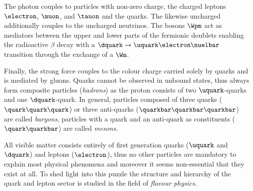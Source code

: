 The photon couples to particles with non-zero \EM charge, \ie the charged
leptons $\electron$, $\muon$, and $\tauon$ and the quarks. The likewise
uncharged \Zboson additionally couples to the uncharged neutrinos. The bosons
$\Wpm$ act as mediators between the upper and lower parts of the fermionic
doublets enabling \eg the radioactive $\beta$ decay with a
$\dquark\to\uquark\electron\nuelbar$ transition through the exchange of a $\Wm$.

Finally, the strong force couples to the colour charge carried solely by quarks
and is mediated by gluons. Quarks cannot be observed in unbound states, thus
always form composite particles (\emph{hadrons}) as \eg the proton consists of
two $\uquark$-quarks and one $\dquark$-quark. In general, particles composed of
three quarks ($\quark\quark\quark$) or three anti-quarks
($\quarkbar\quarkbar\quarkbar$) are called \emph{baryons}, particles with a
quark and an anti-quark as constituents ($\quark\quarkbar$) are called
\emph{mesons}.

All visible matter consists entirely of first generation quarks ($\uquark$ and
$\dquark$) and leptons ($\electron$), thus no other particles are mandatory to
explain most physical phenomena and moreover it seems non-essential that they
exist at all. To shed light into this puzzle the structure and hierarchy of the
quark and lepton sector is studied in the field of \emph{flavour physics}.
